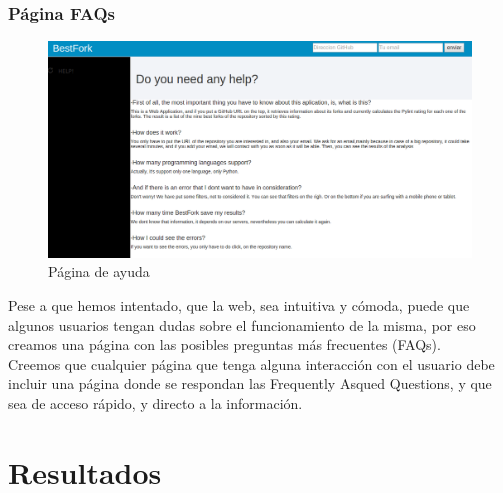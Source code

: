 \documentclass[a4paper, 12pt]{book}
\begin{document}
\subsection{Página FAQs}
\begin{figure}[H]
\centering
\includegraphics[scale=0.35]{img/faqs1.png} 
\caption{Página de ayuda}
\end{figure}
Pese a que hemos intentado, que la web, sea intuitiva y cómoda, puede que algunos usuarios tengan dudas sobre el funcionamiento de la misma, por eso creamos una página con las posibles preguntas más frecuentes (FAQs).\\
Creemos que cualquier página que tenga alguna interacción con el usuario debe incluir una página donde se respondan las Frequently Asqued Questions, y que sea de acceso rápido, y directo a la información.\\





\cleardoublepage
\chapter{Resultados}
\end{document}
